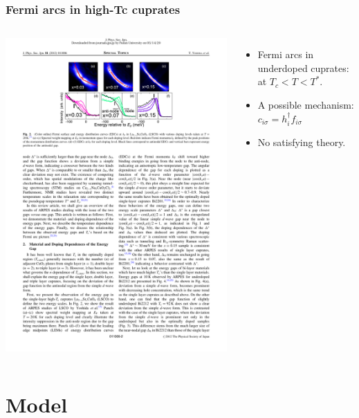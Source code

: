 \documentclass[xcolor=table, 10pt, aspectratio=43]{beamer}
\begin{document}
\begin{frame}
	\frametitle{Fermi arcs in high-Tc cuprates}
	\begin{columns}
		\includegraphics{arc_arpes}
		\begin{itemize}
			\item Fermi arcs in underdoped cuprates: at $T_c<T<T^*$.
			\vspace{3em}
			\item A possible mechanism:
			$c_{i\sigma} = h_i^\dagger f_{i\sigma}$
			\item No satisfying theory.
		\end{itemize}
	\end{columns}
\end{frame}

\section{Model}
\end{document}
